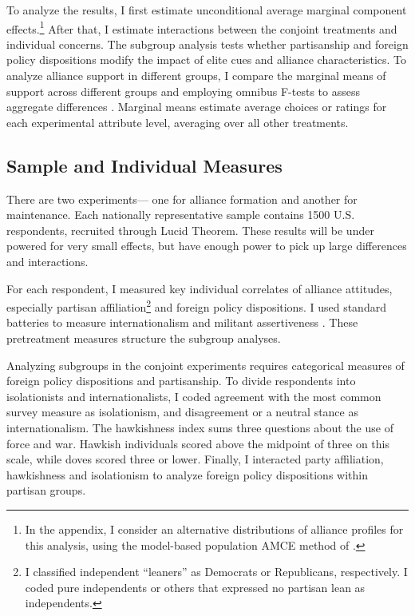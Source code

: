\documentclass[12pt]{article}
\begin{document}
To analyze the results, I first estimate unconditional average marginal component effects.\footnote{In the appendix, I consider an alternative distributions of alliance profiles for this analysis, using the model-based population AMCE method of \citet{delaCuestaetal2021}.}
After that, I estimate interactions between the conjoint treatments and individual concerns.
The subgroup analysis tests whether partisanship and foreign policy dispositions modify the impact of elite cues and alliance characteristics. 
To analyze alliance support in different groups, I compare the marginal means of support across different groups and employing omnibus F-tests to assess aggregate differences \citep{Leeperetal2020}. 
Marginal means estimate average choices or ratings for each experimental attribute level, averaging over all other treatments. 



\subsection{Sample and Individual Measures}


There are two experiments--- one for alliance formation and another for maintenance. 
Each nationally representative sample contains 1500 U.S. respondents, recruited through Lucid Theorem.
These results will be under powered for very small effects, but have enough power to pick up large differences and interactions. 


For each respondent, I measured key individual correlates of alliance attitudes, especially partisan affiliation\footnote{I classified independent ``leaners'' as Democrats or Republicans, respectively. I coded pure independents or others that expressed no partisan lean as independents.} and foreign policy dispositions. 
I used standard batteries to measure internationalism and militant assertiveness \citep{Herrmannetal1999, KertzerBrutger2016}.
These pretreatment measures structure the subgroup analyses. 


Analyzing subgroups in the conjoint experiments requires categorical measures of foreign policy dispositions and partisanship. 
To divide respondents into isolationists and internationalists, I coded agreement with the most common survey measure as isolationism, and disagreement or a neutral stance as internationalism. 
The hawkishness index sums three questions about the use of force and war. 
Hawkish individuals scored above the midpoint of three on this scale, while doves scored three or lower. 
Finally, I interacted party affiliation, hawkishness and isolationism to analyze foreign policy dispositions within partisan groups.
\end{document}
